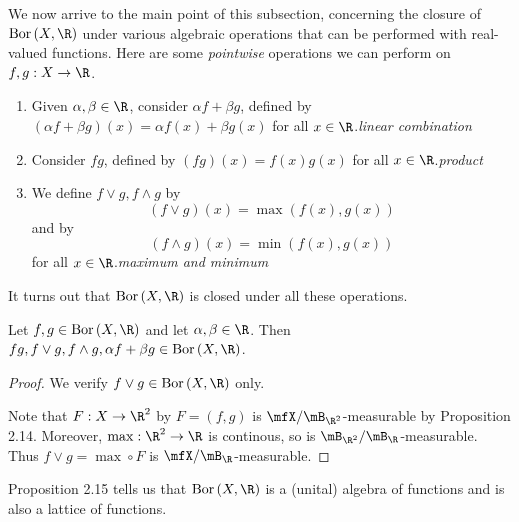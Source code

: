 \documentclass[pmath450]{subfiles}
\begin{document}
    \np We now arrive to the main point of this subsection, concerning the closure of $\bor\left( X,\R \right)$ under various algebraic operations that can be performed with real-valued functions. Here are some \textit{pointwise} operations we can perform on $f,g:X\to\R$.
    \begin{enumerate}
        \item Given $\alpha,\beta\in\R$, consider $\alpha f+\beta g$, defined by $\left( \alpha f+\beta g \right)\left( x \right)=\alpha f\left( x \right)+\beta g\left( x \right)$ for all $x\in\R$.\hfill\textit{linear combination}
        \item Consider $fg$, defined by $\left( fg \right)\left( x \right) = f\left( x \right)g\left( x \right)$ for all $x\in\R$.\hfill\textit{product}
        \item We define $f\vee g, f\wedge g$ by
            \begin{equation*}
                \left( f\vee g \right)\left( x \right) = \max\left( f\left( x \right),g\left( x \right) \right)
            \end{equation*}
            and by
            \begin{equation*}
                \left( f\wedge g \right)\left( x \right)=\min\left( f\left( x \right),g\left( x \right) \right)
            \end{equation*}
            for all $x\in\R$.\hfill\textit{maximum and minimum}
    \end{enumerate}
    It turns out that $\bor\left( X,\R \right)$ is closed under all these operations.

    \begin{prop}{}
        Let $f,g\in\bor\left( X,\R \right)$ and let $\alpha,\beta\in\R$. Then $fg,f\vee g, f\wedge g,\alpha f+\beta g\in\bor\left( X,\R \right)$.
    \end{prop}

    \begin{proof}
        We verify $f\vee g\in\bor\left( X,\R \right)$ only.

        Note that $F:X\to\R^{2}$ by $F=\left( f,g \right)$ is $\mfX /\mB_{\R^{2}}$-measurable by Proposition 2.14. Moreover, $\max:\R^{2}\to\R$ is continous, so is $\mB_{\R^{2}} /\mB_{\R}$-measurable. Thus $f\vee g = \max\circ F$ is $\mfX /\mB_{\R}$-measurable.
    \end{proof}

    \np Proposition 2.15 tells us that $\bor\left( X,\R \right)$ is a (unital) algebra of functions and is also a lattice of functions.
\end{document}
